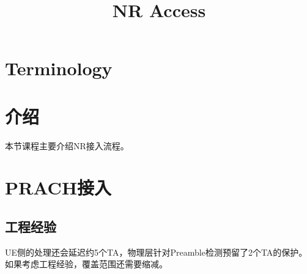 \documentclass{article}
\title{
	\Huge \textbf{NR Access} \\[1em]
}
\author{}
\date{}
\begin{document}
\maketitle

\tableofcontents
\newpage

\section{Terminology}


\section{介绍}
本节课程主要介绍NR接入流程。



\section{PRACH接入}
\subsection{工程经验}
UE侧的处理还会延迟约5个TA，物理层针对Preamble检测预留了2个TA的保护。如果考虑工程经验，覆盖范围还需要缩减。
\end{document}
